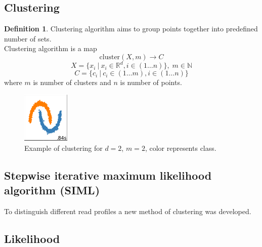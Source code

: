 \documentclass[a4paper, 12pt]{article}
\theoremstyle{definition}
\newtheorem{definition}{Definition}[section]
\theoremstyle{definition}
\theoremstyle{remark}
\begin{document}
\subsection{Clustering}
\begin{definition}
    Clustering algorithm aims to group points together into predefined number of sets. \\
    Clustering algorithm is a map 
    $$\text{cluster} (X, m) \rightarrow C$$
    $$X = \{x_i \:|\: x_i \in \mathbb{R}^d, i \in \left( 1 \ldots n \right) \}, \; m \in \mathbb{N}$$
    $$C = \{ c_i \:|\: c_i \in \left( 1 \ldots m \right), i \in \left( 1 \ldots n \right)\}$$
    where $m$ is number of clusters and $n$ is number of points. 
\end{definition}

\begin{figure}[H]
    \includegraphics{example_clustering}
    \centering
    \caption{Example of clustering for $d=2$, $m=2$, color represents class.}
\end{figure}

\subsection{Stepwise iterative maximum likelihood algorithm (SIML)}
To distinguish different read profiles a new method of clustering was developed.
\subsection{Likelihood}
\end{document}
